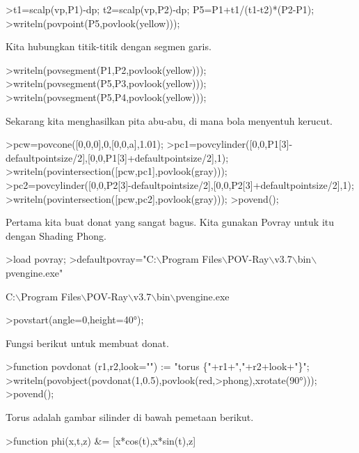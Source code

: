 \documentclass{article}
\begin{document}
\begin{eulernotebook}
\begin{eulercomment}
\begin{eulercomment}
\begin{eulercomment}
\begin{eulercomment}
\begin{eulerprompt}
>t1=scalp(vp,P1)-dp; t2=scalp(vp,P2)-dp; P5=P1+t1/(t1-t2)*(P2-P1);
>writeln(povpoint(P5,povlook(yellow)));
\end{eulerprompt}
\begin{eulercomment}
Kita hubungkan titik-titik dengan segmen garis.
\end{eulercomment}
\begin{eulerprompt}
>writeln(povsegment(P1,P2,povlook(yellow)));
>writeln(povsegment(P5,P3,povlook(yellow)));
>writeln(povsegment(P5,P4,povlook(yellow)));
\end{eulerprompt}
\begin{eulercomment}
Sekarang kita menghasilkan pita abu-abu, di mana bola menyentuh
kerucut.
\end{eulercomment}
\begin{eulerprompt}
>pcw=povcone([0,0,0],0,[0,0,a],1.01);
>pc1=povcylinder([0,0,P1[3]-defaultpointsize/2],[0,0,P1[3]+defaultpointsize/2],1);
>writeln(povintersection([pcw,pc1],povlook(gray)));
>pc2=povcylinder([0,0,P2[3]-defaultpointsize/2],[0,0,P2[3]+defaultpointsize/2],1);
>writeln(povintersection([pcw,pc2],povlook(gray)));
>povend();
\end{eulerprompt}
\begin{eulercomment}
Pertama kita buat donat yang sangat bagus. Kita gunakan Povray untuk
itu dengan Shading Phong.
\end{eulercomment}
\begin{eulerprompt}
>load povray;
>defaultpovray="C:\(\backslash\)Program Files\(\backslash\)POV-Ray\(\backslash\)v3.7\(\backslash\)bin\(\backslash\)pvengine.exe"
\end{eulerprompt}
\begin{euleroutput}
  C:\(\backslash\)Program Files\(\backslash\)POV-Ray\(\backslash\)v3.7\(\backslash\)bin\(\backslash\)pvengine.exe
\end{euleroutput}
\begin{eulerprompt}
>povstart(angle=0,height=40°);
\end{eulerprompt}
\begin{eulercomment}
Fungsi berikut untuk membuat donat.
\end{eulercomment}
\begin{eulerprompt}
>function povdonat (r1,r2,look="") := "torus \{"+r1+","+r2+look+"\}";
>writeln(povobject(povdonat(1,0.5),povlook(red,>phong),xrotate(90°)));
>povend();
\end{eulerprompt}
\begin{eulercomment}
Torus adalah gambar silinder di bawah pemetaan berikut.
\end{eulercomment}
\begin{eulerprompt}
>function phi(x,t,z) &= [x*cos(t),x*sin(t),z]
\end{eulerprompt}
\begin{euleroutput}
  

\end{euleroutput}
\end{eulercomment}
\end{eulercomment}
\end{eulercomment}
\end{eulercomment}
\end{eulernotebook}
\end{document}
